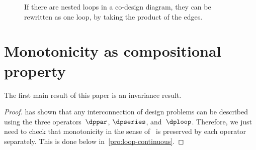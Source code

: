\begin{figure}[H]
\caption{\label{fig:If-there-are}If there are nested loops in a co-design
diagram, they can be rewritten as one loop, by taking the product
of the edges.}
\end{figure}





\section{Monotonicity as compositional property\label{sec:Monotone-Co-Design-Problems}}

The first main result of this paper is an invariance result. 

 

\noindent 
{}

\begin{proof}
 has shown that any interconnection of design
problems can be described using the three operators~$\dppar$, $\dpseries$,
and~$\dploop$. Therefore, we just need to check that monotonicity
in the sense of~ is preserved by each operator
separately. This is done below in~\textendash \ref{pro:loop-continuous}. 
\end{proof}

